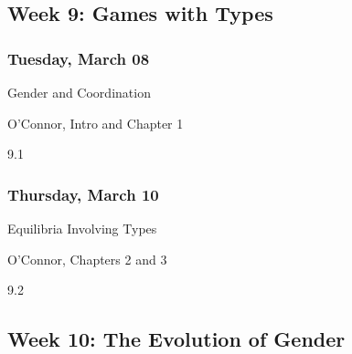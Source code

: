 \documentclass[
]{article}
\providecommand{\tightlist}{%
  \setlength{\itemsep}{0pt}\setlength{\parskip}{0pt}}
\begin{document}
\newpage

\hypertarget{week-9-games-with-types}{%
\subsection{Week 9: Games with Types}\label{week-9-games-with-types}}

\begin{multicols}{2}

\hypertarget{tuesday-march-08}{%
\subsubsection{Tuesday, March 08}\label{tuesday-march-08}}

\begin{description}
\tightlist
\item[Topic]
Gender and Coordination
\item[Reading]
O'Connor, Intro and Chapter 1
\item[Video lectures]
9.1
\end{description}

\hypertarget{thursday-march-10}{%
\subsubsection{Thursday, March 10}\label{thursday-march-10}}

\begin{description}
\tightlist
\item[Topic]
Equilibria Involving Types
\item[Reading]
O'Connor, Chapters 2 and 3
\item[Video lectures]
9.2
\end{description}

\end{multicols}

\hypertarget{week-10-the-evolution-of-gender}{%
\subsection{Week 10: The Evolution of
Gender}\label{week-10-the-evolution-of-gender}}
\end{document}
